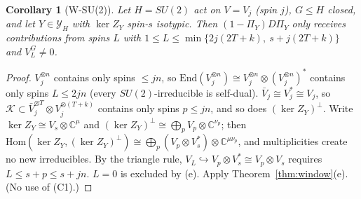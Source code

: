\documentclass[11pt]{article}
\newcommand{\C}{\mathbb{C}}
\newtheorem{corollary}[theorem]{Corollary}
\theoremstyle{definition}
\theoremstyle{remark}
\begin{document}
\begin{corollary}[W-SU(2)]\label{cor:WSU2}
Let $H=SU(2)$ act on $V=V_j$ (spin $j$), $G\le H$ closed, and let $Y\in\mathcal Y_H$ with $\ker Z_Y$ spin-$s$ isotypic. Then
$(1-\Pi_Y)D\Pi_Y$ only receives contributions from spins $L$ with $1\le L\le\min\{2j(2T+k),\ s+j(2T+k)\}$ and $V_L^G\ne0$.
\end{corollary}
\begin{proof}
$V_j^{\otimes n}$ contains only spins $\le jn$, so $\mathrm{End}(V_j^{\otimes n})\cong V_j^{\otimes n}\otimes(V_j^{\otimes n})^*$ contains only spins
$L\le2jn$ (every $SU(2)$-irreducible is self-dual). $\bar V_j\cong V_j^\ast\cong V_j$, so $\mathcal K\subset\bar V_j^{\otimes T}\otimes V_j^{\otimes(T+k)}$ contains only
spins $p\le jn$, and so does $(\ker Z_Y)^\perp$. Write $\ker Z_Y\cong V_s\otimes\C^\mu$ and $(\ker Z_Y)^\perp\cong\bigoplus_pV_p\otimes\C^{\nu_p}$; then
$\mathrm{Hom}(\ker Z_Y,(\ker Z_Y)^\perp)\cong\bigoplus_p(V_p\otimes V_s^\ast)\otimes\C^{\mu\nu_p}$, and multiplicities create no new irreducibles. By the
triangle rule, $V_L\hookrightarrow V_p\otimes V_s^\ast\cong V_p\otimes V_s$ requires $L\le s+p\le s+jn$. $L=0$
is excluded by (e). Apply Theorem~\ref{thm:window}(e). (No use of (C1).)
\end{proof}
\end{document}
